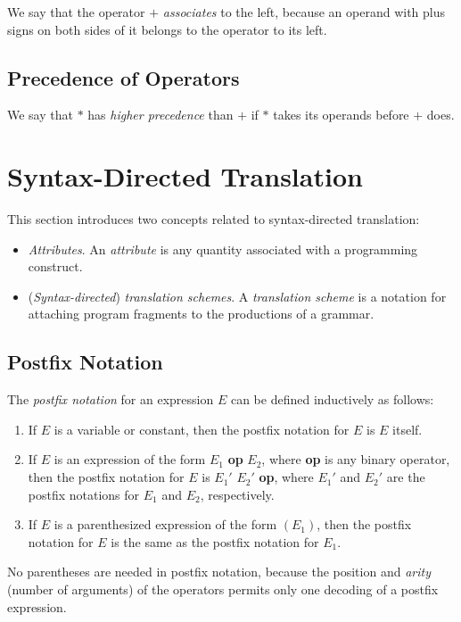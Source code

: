 \documentclass[12pt,a4paper,twoside,openany]{book}
\begin{document}
We say that the operator $+$ \textit{associates} to the left, because an operand with plus signs on both sides of it belongs to the operator to its left.

\subsection{Precedence of Operators}

We say that $*$ has \textit{higher precedence} than $+$ if $*$ takes its operands before $+$ does.

\section{Syntax-Directed Translation}

This section introduces two concepts related to syntax-directed translation:
\begin{itemize}
    \item\textit{Attributes}. An \textit{attribute} is any quantity associated with a programming construct.
    \item(\textit{Syntax-directed}) \textit{translation schemes}. A \textit{translation scheme} is a notation for attaching program fragments to the productions of a grammar.
\end{itemize}

\subsection{Postfix Notation}

The \textit{postfix notation} for an expression $E$ can be defined inductively as follows:
\begin{enumerate}
    \item If $E$ is a variable or constant, then the postfix notation for $E$ is $E$ itself.
    \item If $E$ is an expression of the form $E_1$ \textbf{op} $E_2$, where \textbf{op} is any binary operator, then the postfix notation for $E$ is $E_1'$ $E_2'$ \textbf{op}, where $E_1'$ and $E_2'$ are the postfix notations for $E_1$ and $E_2$, respectively.
    \item If $E$ is a parenthesized expression of the form $(E_1)$, then the postfix notation for $E$ is the same as the postfix notation for $E_1$.
\end{enumerate}

No parentheses are needed in postfix notation, because the position and \textit{arity} (number of arguments) of the operators permits only one decoding of a postfix expression.
\end{document}
